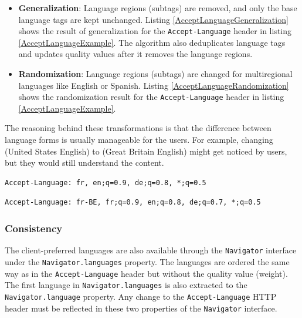 \begin{itemize}
	\item \textbf{Generalization}: Language regions (subtags) are removed, and only the base language tags are kept unchanged. Listing \ref{AcceptLanguageGeneralization} shows the result of generalization for the \texttt{Accept-Language} header in listing \ref{AcceptLanguageExample}. The algorithm also deduplicates language tags and updates quality values after it removes the language regions.
	\item \textbf{Randomization}: Language regions (subtags) are changed for multiregional languages like English or Spanish. Listing \ref{AcceptLanguageRandomization} shows the randomization result for the \texttt{Accept-Language} header in listing \ref{AcceptLanguageExample}.
\end{itemize}

The reasoning behind these transformations is that the difference between language forms is usually manageable for the users. For example, changing  (United States English) to  (Great Britain English) might get noticed by users, but they would still understand the content.

\bigbreak

\begin{lstlisting}[caption={The result of the \uv{generalization} mode transformation of listing \ref{AcceptLanguageExample}.}, label={AcceptLanguageGeneralization}]
Accept-Language: fr, en;q=0.9, de;q=0.8, *;q=0.5
\end{lstlisting}

\begin{lstlisting}[caption={The result of the \uv{randomization} mode transformation of listing \ref{AcceptLanguageExample}.}, label={AcceptLanguageRandomization}]
Accept-Language: fr-BE, fr;q=0.9, en;q=0.8, de;q=0.7, *;q=0.5
\end{lstlisting}


\subsubsection{Consistency}

The client-preferred languages are also available through the \texttt{Navigator} interface under the \texttt{Navigator.languages} property. The languages are ordered the same way as in the \texttt{Accept-Language} header but without the quality value (weight). The first language in \texttt{Navigator.languages} is also extracted to the \texttt{Navigator.language} property. Any change to the \texttt{Accept-Language} HTTP header must be reflected in these two properties of the \texttt{Navigator} interface.

